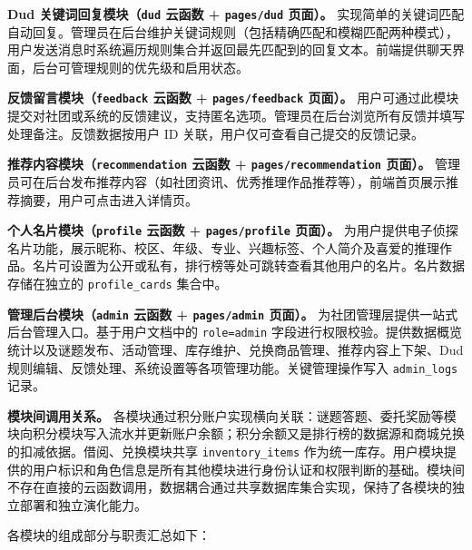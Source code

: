 \documentclass[a4paper,12pt]{article}
\begin{document}
\textbf{Dud 关键词回复模块（\texttt{dud} 云函数 + \texttt{pages/dud} 页面）。} 实现简单的关键词匹配自动回复。管理员在后台维护关键词规则（包括精确匹配和模糊匹配两种模式），用户发送消息时系统遍历规则集合并返回最先匹配到的回复文本。前端提供聊天界面，后台可管理规则的优先级和启用状态。

\textbf{反馈留言模块（\texttt{feedback} 云函数 + \texttt{pages/feedback} 页面）。} 用户可通过此模块提交对社团或系统的反馈建议，支持匿名选项。管理员在后台浏览所有反馈并填写处理备注。反馈数据按用户 ID 关联，用户仅可查看自己提交的反馈记录。

\textbf{推荐内容模块（\texttt{recommendation} 云函数 + \texttt{pages/recommendation} 页面）。} 管理员可在后台发布推荐内容（如社团资讯、优秀推理作品推荐等），前端首页展示推荐摘要，用户可点击进入详情页。

\textbf{个人名片模块（\texttt{profile} 云函数 + \texttt{pages/profile} 页面）。} 为用户提供电子侦探名片功能，展示昵称、校区、年级、专业、兴趣标签、个人简介及喜爱的推理作品。名片可设置为公开或私有，排行榜等处可跳转查看其他用户的名片。名片数据存储在独立的 \texttt{profile\_cards} 集合中。

\textbf{管理后台模块（\texttt{admin} 云函数 + \texttt{pages/admin} 页面）。} 为社团管理层提供一站式后台管理入口。基于用户文档中的 \texttt{role=admin} 字段进行权限校验。提供数据概览统计以及谜题发布、活动管理、库存维护、兑换商品管理、推荐内容上下架、Dud 规则编辑、反馈处理、系统设置等各项管理功能。关键管理操作写入 \texttt{admin\_logs} 记录。

\textbf{模块间调用关系。} 各模块通过积分账户实现横向关联：谜题答题、委托奖励等模块向积分模块写入流水并更新账户余额；积分余额又是排行榜的数据源和商城兑换的扣减依据。借阅、兑换模块共享 \texttt{inventory\_items} 作为统一库存。用户模块提供的用户标识和角色信息是所有其他模块进行身份认证和权限判断的基础。模块间不存在直接的云函数调用，数据耦合通过共享数据库集合实现，保持了各模块的独立部署和独立演化能力。

各模块的组成部分与职责汇总如下：
\end{document}
